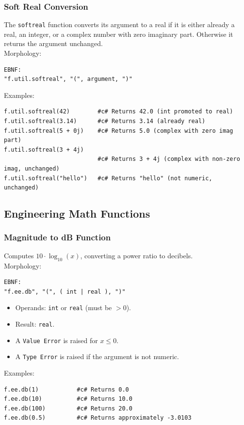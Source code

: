 \subsubsection{Soft Real Conversion}
The \texttt{softreal} function converts its argument to a real if it is either already a real, an integer, or a complex number with zero imaginary part. Otherwise it returns the argument unchanged. \\
Morphology:
\begin{verbatim}
EBNF:
"f.util.softreal", "(", argument, ")"
\end{verbatim}
Examples:
\begin{verbatim}
f.util.softreal(42)        #c# Returns 42.0 (int promoted to real)
f.util.softreal(3.14)      #c# Returns 3.14 (already real)
f.util.softreal(5 + 0j)    #c# Returns 5.0 (complex with zero imag part)
f.util.softreal(3 + 4j)
                           #c# Returns 3 + 4j (complex with non-zero imag, unchanged)
f.util.softreal("hello")   #c# Returns "hello" (not numeric, unchanged)
\end{verbatim}

\subsection{Engineering Math Functions}

\subsubsection{Magnitude to dB Function}
Computes $10 \cdot \log_{10}(x)$, converting a power ratio to decibels. \\
Morphology:
\begin{verbatim}
EBNF:
"f.ee.db", "(", ( int | real ), ")"
\end{verbatim}
\begin{itemize}
\item Operands: \texttt{int} or \texttt{real} (must be $> 0$).
\item Result: \texttt{real}.
\item A \texttt{Value Error} is raised for $x \leq 0$.
\item A \texttt{Type Error} is raised if the argument is not numeric.
\end{itemize}
Examples:
\begin{verbatim}
f.ee.db(1)           #c# Returns 0.0
f.ee.db(10)          #c# Returns 10.0
f.ee.db(100)         #c# Returns 20.0
f.ee.db(0.5)         #c# Returns approximately -3.0103
\end{verbatim}

